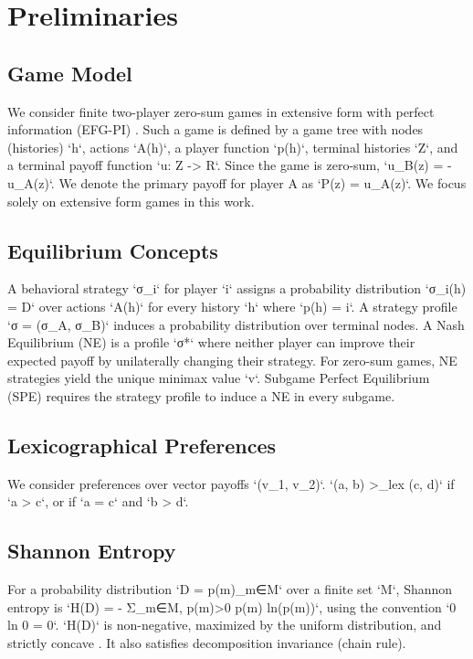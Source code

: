 \documentclass{article}
\begin{document}
\section{Preliminaries}

\subsection{Game Model}
We consider finite two-player zero-sum games in extensive form with perfect information (EFG-PI) \cite{placeholder_osborne_rubinstein}. Such a game is defined by a game tree with nodes (histories) `h`, actions `A(h)`, a player function `p(h)`, terminal histories `Z`, and a terminal payoff function `u: Z -> R`. Since the game is zero-sum, `u_B(z) = -u_A(z)`. We denote the primary payoff for player A as `P(z) = u_A(z)`. We focus solely on extensive form games in this work.

\subsection{Equilibrium Concepts}
A behavioral strategy `σ_i` for player `i` assigns a probability distribution `σ_i(h) = D` over actions `A(h)` for every history `h` where `p(h) = i`. A strategy profile `σ = (σ_A, σ_B)` induces a probability distribution over terminal nodes. A Nash Equilibrium (NE) is a profile `σ*` where neither player can improve their expected payoff by unilaterally changing their strategy. For zero-sum games, NE strategies yield the unique minimax value `v`. Subgame Perfect Equilibrium (SPE) requires the strategy profile to induce a NE in every subgame.

\subsection{Lexicographical Preferences}
We consider preferences over vector payoffs `(v_1, v_2)`. `(a, b) >_{lex} (c, d)` if `a > c`, or if `a = c` and `b > d`.

\subsection{Shannon Entropy}
For a probability distribution `D = {p(m)}_{m∈M}` over a finite set `M`, Shannon entropy is `H(D) = - Σ_{m∈M, p(m)>0} p(m) ln(p(m))`, using the convention `0 ln 0 = 0`. `H(D)` is non-negative, maximized by the uniform distribution, and strictly concave \cite{placeholder_cover_thomas}. It also satisfies decomposition invariance (chain rule).
\end{document}
